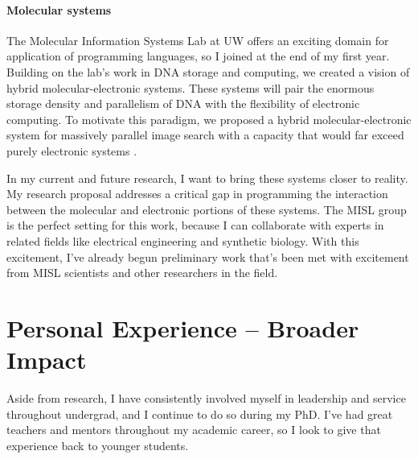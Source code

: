 \documentclass[12pt]{article}
\begin{document}
\paragraph*{Molecular systems}
The Molecular Information Systems Lab at UW offers an exciting domain for application of programming languages, so I joined at the end of my first year.
Building on the lab's work in DNA storage and computing, we created a vision of hybrid molecular-electronic systems.
These systems will pair the enormous storage density and parallelism of DNA with the flexibility of electronic computing.
To motivate this paradigm, we proposed a hybrid molecular-electronic system for massively parallel image search with a capacity that would far exceed purely electronic systems \cite{molecularelectronic}.

In my current and future research, I want to bring these systems closer to reality.
My research proposal addresses a critical gap in programming the interaction between the molecular and electronic portions of these systems.
The MISL group is the perfect setting for this work, because
I can collaborate with experts in related fields like electrical engineering and synthetic biology.
With this excitement, I've already begun preliminary work that's been met with excitement from MISL scientists and other researchers in the field.


\section*{Personal Experience -- Broader Impact}

Aside from research, I have consistently involved myself in leadership and service throughout undergrad, and I continue to do so during my PhD.
I've had great teachers and mentors throughout my academic career, so I look to give that experience back to younger students.
\end{document}
